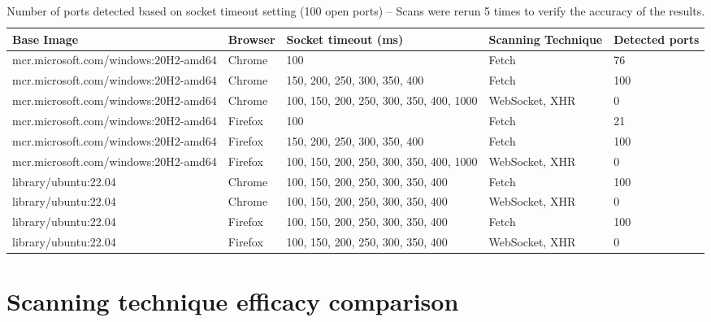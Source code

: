 \begin{table}[htbp]
\footnotesize
\centering
\begin{adjustwidth}{-1.0cm}{}
\begin{tabular}{p{6.3cm}p{1.5cm}p{3cm}p{2cm}p{2cm}}
    \toprule
    Base Image & Browser & Socket timeout (ms) & Scanning Technique & Detected ports \\
     \midrule
    mcr.microsoft.com/windows:20H2-amd64 & Chrome & 100 & Fetch & 76 \\
    mcr.microsoft.com/windows:20H2-amd64 & Chrome & 150, 200, 250, 300, 350, 400 & Fetch & 100 \\
    mcr.microsoft.com/windows:20H2-amd64 & Chrome & 100, 150, 200, 250, 300, 350, 400, 1000 & WebSocket, XHR & 0 \\
    \midrule
    mcr.microsoft.com/windows:20H2-amd64 & Firefox & 100 & Fetch & 21 \\
    mcr.microsoft.com/windows:20H2-amd64 & Firefox & 150, 200, 250, 300, 350, 400 & Fetch & 100 \\
    mcr.microsoft.com/windows:20H2-amd64 & Firefox & 100, 150, 200, 250, 300, 350, 400, 1000 & WebSocket, XHR & 0 \\
    \midrule
    library/ubuntu:22.04 & Chrome & 100, 150, 200, 250, 300, 350, 400 & Fetch & 100 \\
    library/ubuntu:22.04 & Chrome & 100, 150, 200, 250, 300, 350, 400 & WebSocket, XHR & 0 \\
    \midrule
    library/ubuntu:22.04 & Firefox & 100, 150, 200, 250, 300, 350, 400 & Fetch & 100 \\
    library/ubuntu:22.04 & Firefox & 100, 150, 200, 250, 300, 350, 400 & WebSocket, XHR & 0 \\
     \bottomrule
\end{tabular}
\end{adjustwidth}{}
\caption{Number of ports detected based on socket timeout setting (100 open ports) -- Scans were rerun 5 times to verify the accuracy of the results.}
\label{tab:socket-timeout-comparison}
\end{table}
\clearpage


\section{Scanning technique efficacy comparison}

